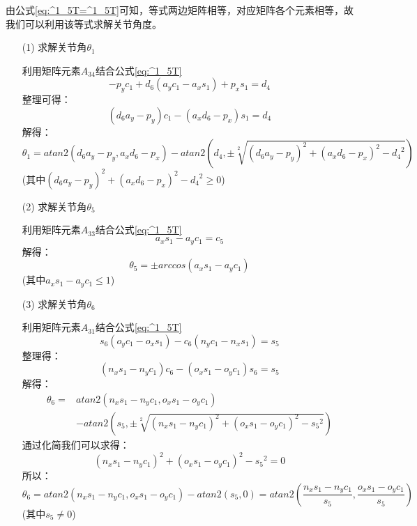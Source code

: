 \documentclass{seuthesis-2022}
\numberwithin{equation}{section}
\begin{document}
由公式\eqref{eq:^1_5T=^1_5T}可知，等式两边矩阵相等，对应矩阵各个元素相等，故我们可以利用该等式求解关节角度。
\begin{itemize}
  \item [(1)]
  求解关节角$\theta_1$

  利用矩阵元素$A_{34}$结合公式\eqref{eq:^1_5T}
  \begin{equation}
    -p_yc_1+d_6(a_yc_1-a_xs_1)+p_xs_1 = d_4
  \end{equation}
  整理可得：
  \begin{equation}
    (d_6a_y-p_y)c_1 - (a_xd_6-p_x)s_1 = d_4
  \end{equation}
  解得：
  \begin{equation}
    \theta_1 = atan2(d_6a_y-p_y,a_xd_6-p_x)-atan2(d_4,\pm \sqrt[2]{(d_6a_y-p_y)^2+(a_xd_6-p_x)^2-{d_4}^2} )
  \end{equation}
  (其中$(d_6a_y-p_y)^2+(a_xd_6-p_x)^2-{d_4}^2 \geq 0$)
  \item [(2)]
  求解关节角$\theta_5$

  利用矩阵元素$A_{33}$结合公式\eqref{eq:^1_5T}
  \begin{equation}
    a_xs_1-a_yc_1 = c_5
  \end{equation}
  解得：
  \begin{equation}
    \theta_5 = \pm arccos(a_xs_1-a_yc_1)
  \end{equation}
  (其中$a_xs_1-a_yc_1 \leq 1$)
  \item [(3)]
  求解关节角$\theta_6$

  利用矩阵元素$A_{31}$结合公式\eqref{eq:^1_5T}
  \begin{equation}
    s_6(o_yc_1-o_xs_1)-c_6(n_yc_1-n_xs_1)=s_5
  \end{equation}
  整理得：
  \begin{equation}
    (n_xs_1-n_yc_1)c_6 - (o_xs_1-o_yc_1)s_6 = s_5
  \end{equation}
  解得：
  \begin{equation}
    \begin{aligned}
      \theta_6 = &atan2(n_xs_1-n_yc_1,o_xs_1-o_yc_1)\\
                  &-atan2(s_5,\pm \sqrt[2]{(n_xs_1-n_yc_1)^2+(o_xs_1-o_yc_1)^2-{s_5}^2})
    \end{aligned}
  \end{equation}
  通过化简我们可以求得：
  \begin{equation}
    (n_xs_1-n_yc_1)^2+(o_xs_1-o_yc_1)^2-{s_5}^2 = 0
  \end{equation}
  所以：
  \begin{equation}
    \theta_6 = atan2(n_xs_1-n_yc_1,o_xs_1-o_yc_1)-atan2(s_5,0) = atan2(\frac{n_xs_1-n_yc_1}{s_5},\frac{o_xs_1-o_yc_1}{s_5})
  \end{equation}
  (其中$s_5 \neq 0$)
\end{itemize}
  
\end{document}
